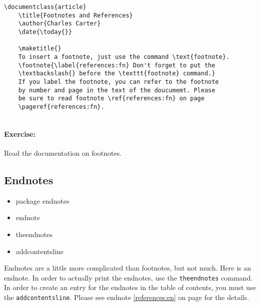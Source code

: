         \begin{verbatim}
\documentclass{article}
    \title{Footnotes and References}
    \author{Charles Carter}
    \date{\today{}}
 
    \maketitle{}
    To insert a footnote, just use the command \text{footnote}.
    \footnote{\label{references:fn} Don't forget to put the 
    \textbackslash{} before the \texttt{footnote} command.} 
    If you label the footnote, you can refer to the footnote 
    by number and page in the text of the doucumemt. Please 
    be sure to read footnote \ref{references:fn} on page 
    \pageref{references:fn}.
    
        \end{verbatim}

        \paragraph{Exercise:} Read the \Lx{} documentation on footnotes.

    \subsection{Endnotes}
    \label{Endnotes}
        
        \begin{framed}
            \begin{itemize}
                \item{package endnotes}
                \item{endnote}
                \item{theendnotes}
                \item{addcontentsline}
            \end{itemize}
        \end{framed}

    Endnotes are a little more complicated than footnotes, but not much. Here is an endnote. In order to actually print the endnotes, use the \texttt{theendnotes} command. In order to create an entry for the endnotes in the table of contents, you must use the \texttt{addcontentsline}. Please see endnote \ref{references:en} on page \pageref{references:en} for the details.

